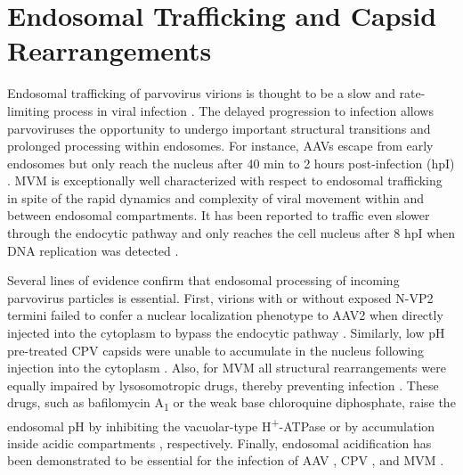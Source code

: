 \section{Endosomal Trafficking and Capsid Rearrangements}
\label{Rearrangements}
Endosomal trafficking of parvovirus virions is thought to be a slow and rate-limiting process in viral infection \cite{pmid10841516, pmid10623762, pmid11287557, pmid16379002}. The delayed progression to infection allows parvoviruses the opportunity to undergo important structural transitions and prolonged processing within endosomes. For instance, AAVs escape from early endosomes but only reach the nucleus after 40 min to 2 hours post-infection (hpI) \cite{pmid10684294, pmid12388712}. MVM is exceptionally well characterized with respect to endosomal trafficking in spite of the rapid dynamics and complexity of viral movement within and between endosomal compartments. It has been reported to traffic even slower through the endocytic pathway and only reaches the cell nucleus after 8 hpI when DNA replication was detected \cite{pmid12438589}.       

Several lines of evidence confirm that endosomal processing of incoming parvovirus particles is essential. First, virions with or without exposed N-VP2 termini failed to confer a nuclear localization phenotype to AAV2 when directly injected into the cytoplasm to bypass the endocytic pathway \cite{pmid16956943, pmid15829993}. Similarly, low pH pre-treated CPV capsids were unable to accumulate in the nucleus following injection into the cytoplasm \cite{pmid9420290}. Also, for MVM all structural rearrangements were equally impaired by lysosomotropic drugs, thereby preventing infection \cite{pmid16379002, pmid12438589}. These drugs, such as bafilomycin A\textsubscript{1} or the weak base chloroquine diphosphate, raise the endosomal pH by inhibiting the vacuolar-type H\textsuperscript{+}-ATPase \cite{pmid2973058, pmid6094416, BafA1} or by accumulation inside acidic compartments \cite{pmid4606365, pmid28524, pmid6169733}, respectively. Finally, endosomal acidification has been demonstrated to be essential for the infection of AAV \cite{pmid10684294, pmid15681453, pmid11160681, pmid11287557}, CPV \cite{pmid10644365, pmid9420290, pmid1733094}, and MVM \cite{pmid16379002, pmid12438589}.  



